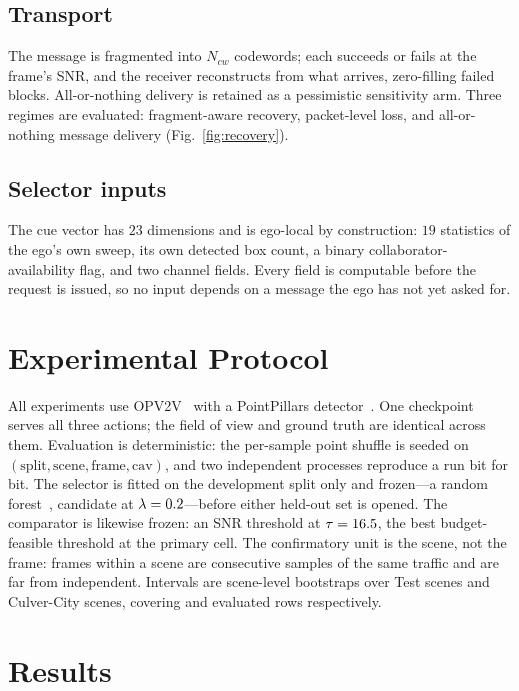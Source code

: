 \documentclass[journal]{IEEEtran}
\begin{document}
\subsection{Transport}
The message is fragmented into $N_{cw}$ codewords; each succeeds or fails at the frame's SNR, and
the receiver reconstructs from what arrives, zero-filling failed blocks. All-or-nothing delivery is
retained as a pessimistic sensitivity arm. Three regimes are
evaluated: fragment-aware recovery, packet-level loss, and all-or-nothing message delivery
(Fig.~\ref{fig:recovery}).

\subsection{Selector inputs}
The cue vector has $23$ dimensions and is ego-local by construction: $19$ statistics of the ego's
own sweep, its own detected box count, a binary collaborator-availability flag, and two channel
fields. Every field is computable before the request is issued, so no input depends on a message the
ego has not yet asked for.

\section{Experimental Protocol}
All experiments use OPV2V~\cite{xu2022opv2v} with a PointPillars
detector~\cite{lang2019pointpillars}. One checkpoint serves all three actions; the field of view and ground truth are identical across
them. Evaluation is deterministic: the per-sample point shuffle is seeded on
$(\text{split},\text{scene},\text{frame},\text{cav})$, and two independent processes reproduce a run
bit for bit. The selector is fitted on the development split only and frozen---a random forest~\cite{breiman2001random}, candidate
\CandIdx{} at $\lambda=0.2$---before either held-out set is opened. The comparator is likewise
frozen: an SNR threshold at $\tau=16.5$, the best budget-feasible threshold at the primary cell.
The confirmatory unit is the scene, not the frame: frames within a
scene are consecutive samples of the same traffic and are far from independent. Intervals are
scene-level bootstraps over \TestScenes{} Test scenes and \CulverScenes{} Culver-City scenes,
covering \TestRows{} and \CulverRows{} evaluated rows respectively.

\section{Results}
\end{document}
